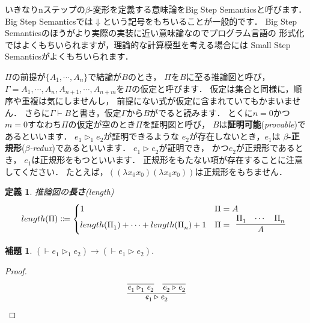 \documentclass{ltjsbook}%
\newtheorem{lemma}{補題}[section]%
\newtheorem{definition}{定義}[section]%
\newcommand\term[2]{\textbf{#1}{(\textit{#2})}}%
\begin{document}
いきなりnステップの$\beta$-変形を定義する意味論をBig Step Semanticsと呼びます．%
Big Step Semanticsでは$\Downarrow$という記号をもちいることが一般的です．%
Big Step Semanticsのほうがより実際の実装に近い意味論なのでプログラム言語の%
形式化ではよくもちいられますが，理論的な計算模型を考える場合には%
Small Step Semanticsがよくもちいられます．%
\par$\Pi$の前提が$\{A_1^{},\cdots,A_n^{}\}$で結論が$B$のとき，%
$\Pi$を$B$に至る推論図と呼び，%
$\Gamma=A_1^{},\cdots,A_n^{},A_{n+1}^{},\cdots,A_{n+m}^{}$を$\Pi$の仮定と呼びます．%
仮定は集合と同様に，順序や重複は気にしませんし，%
前提にない式が仮定に含まれていてもかまいません．%
さらに$\Gamma\vdash B$と書き，仮定$\Gamma$から$B$がでると読みます．%
とくに$n=0$かつ$m=0$すなわち$\Pi$の仮定が空のとき$\Pi$を証明図と呼び，%
$B$は\term{証明可能}{provable}であるといいます．%
$\mathit{e}_1^{}\triangleright_1^{}\mathit{e}_2^{}$が証明できるような%
$\mathit{e}_2^{}$が存在しないとき，$\mathit{e}_1^{}$は%
\term{$\beta$-正規形}{$\beta$-redux}であるといいます．%
$\mathit{e}_1^{}\triangleright\mathit{e}_2^{}$が証明でき，%
かつ$\mathit{e}_2^{}$が正規形であるとき，%
$\mathit{e}_1^{}$は正規形をもつといいます．%
正規形をもたない項が存在することに注意してください．%
たとえば，$((\lambda x_0x_0)(\lambda x_0x_0))$は正規形をもちません．%
\begin{definition}%
推論図の\term{長さ}{length}%
\begin{equation}%
  length(\Pi)\Coloneqq\begin{cases}%
  1&\Pi=A\\%
  length(\Pi_1^{})+\cdots+length(\Pi_n^{})+1%
  &\Pi=\begin{array}{c}\infer{A}{\Pi_1^{}&\cdots&\Pi_n^{}}\end{array}%
  \end{cases}%
\end{equation}%
\end{definition}%
\begin{lemma}%
  \label{lemma:beta_reduct1n}%
  $(\vdash\mathit{e}_1^{}\triangleright_1^{}\mathit{e}_2^{})\rightarrow%
  (\vdash\mathit{e}_1^{}\triangleright\mathit{e}_2^{})$.%
\end{lemma}%
\begin{proof}%
  \begin{equation}%
    \infer{%
      \mathit{e}_1^{}\triangleright\mathit{e}_2^{}%
    }{%
      \infer{\mathit{e}_1^{}\triangleright_1^{}\mathit{e}_2^{}}{}%
    &%
      \infer{\mathit{e}_2^{}\triangleright\mathit{e}_2^{}}{}%
    }%
  \end{equation}%
\end{proof}%
\end{document}
